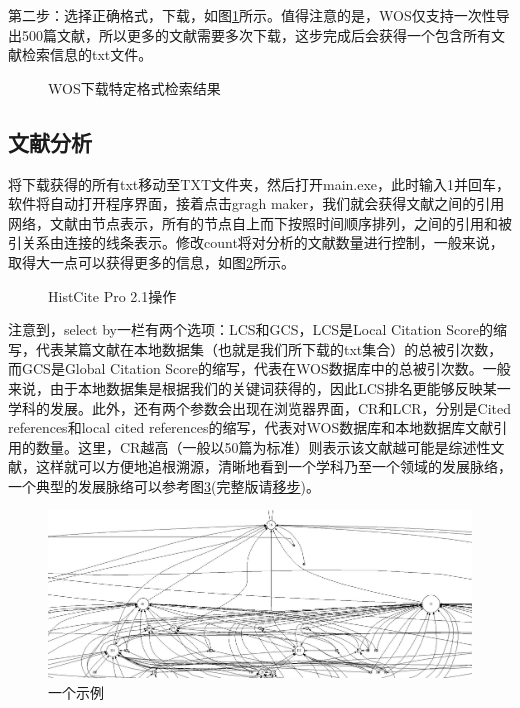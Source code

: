 \documentclass[UTF8]{ctexbook}
\begin{document}
第二步：选择正确格式，下载，如图\ref{fig:2}所示。值得注意的是，WOS仅支持一次性导出500篇文献，所以更多的文献需要多次下载，这步完成后会获得一个包含所有文献检索信息的txt文件。

\begin{figure}[!htb]
	\centering
	\vspace{-0.3cm}
	\caption{WOS下载特定格式检索结果}\label{fig:2}
\end{figure}

\subsection{文献分析}
将下载获得的所有txt移动至TXT文件夹，然后打开main.exe，此时输入1并回车，软件将自动打开程序界面，接着点击gragh maker，我们就会获得文献之间的引用网络，文献由节点表示，所有的节点自上而下按照时间顺序排列，之间的引用和被引关系由连接的线条表示。修改count将对分析的文献数量进行控制，一般来说，取得大一点可以获得更多的信息，如图\ref{fig:3}所示。

\begin{figure}[!htb]
	\centering
	\vspace{-0.3cm}
	\caption{HistCite Pro 2.1操作}\label{fig:3}
\end{figure}


注意到，select by一栏有两个选项：LCS和GCS，LCS是Local Citation Score的缩写，代表某篇文献在本地数据集（也就是我们所下载的txt集合）的总被引次数，而GCS是Global Citation Score的缩写，代表在WOS数据库中的总被引次数。一般来说，由于本地数据集是根据我们的关键词获得的，因此LCS排名更能够反映某一学科的发展。此外，还有两个参数会出现在浏览器界面，CR和LCR，分别是Cited references和local cited references的缩写，代表对WOS数据库和本地数据库文献引用的数量。这里，CR越高（一般以50篇为标准）则表示该文献越可能是综述性文献，这样就可以方便地追根溯源，清晰地看到一个学科乃至一个领域的发展脉络，一个典型的发展脉络可以参考图\ref{fig:typical_trace}(完整版请\href{https://raw.githubusercontent.com/lonelybag/Latex_lonelybag/V1.0/Script/002_NOTE_of_MASTER/Figure/typical_trace_full.jpg}{移步})。

\begin{figure}[!htb]
	\centering
	\includegraphics[width=1\linewidth]{Figure/typical_trace.JPG}
	\vspace{-0.3cm}
	\caption{一个示例}\label{fig:typical_trace}
\end{figure}
\end{document}
